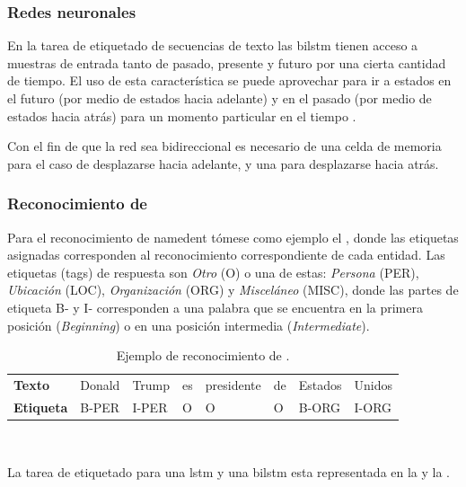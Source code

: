 \subsubsection{Redes neuronales }
En la tarea de etiquetado de secuencias de texto las \gls{bilstm} tienen acceso a muestras de entrada tanto de pasado, presente y futuro por una cierta cantidad de tiempo. El uso de esta característica se puede aprovechar para ir a estados en el futuro (por medio de estados hacia adelante) y en el pasado (por medio de estados hacia atrás) para un momento particular en el tiempo \cite{Huang2015}.

Con el fin de que la red sea bidireccional es necesario de una celda de memoria para el caso de desplazarse hacia adelante, y una para desplazarse hacia atrás.

\subsubsection{Reconocimiento de }
Para el reconocimiento de \gls{namedent} tómese como ejemplo el , donde las etiquetas asignadas corresponden al reconocimiento correspondiente de cada entidad.
Las etiquetas (tags) de respuesta son \emph{Otro} (\textsc{O}) o una de estas: \emph{Persona} (\textsc{PER}), \emph{Ubicación} (\textsc{LOC}), \emph{Organización} (\textsc{ORG}) y \emph{Misceláneo} (\textsc{MISC}), donde las partes de etiqueta \textsc{B-} y \textsc{I-} corresponden a una palabra que se encuentra en la primera posición (\textsl{Beginning}) o en una posición intermedia (\textsl{Intermediate}).

\begin{table}[H]
  \centering
  \begin{tabular}{l|lllllll}
    \textbf{Texto}    & Donald   & Trump & es & presidente & de & Estados & Unidos \\
    \textbf{Etiqueta} & B-PER    & I-PER & O  & O          & O  & B-ORG   & I-ORG
  \end{tabular}
  \\ [1em]
  \decoRule
  \caption{Ejemplo de reconocimiento de .}
  \label{table:namedent-example}
\end{table}

La tarea de etiquetado para una \gls{lstm} y una \gls{bilstm} esta representada en la  y la .

